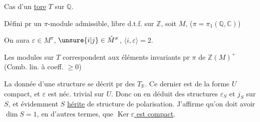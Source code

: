 
Cas d'un \uline{tore} $T$ sur $\mathbb Q$.

Défini pr un $\pi$-module admissible, libre d.t.f. sur $\mathbb Z$, soit $M$, ($\pi=\pi_1(\mathbb Q,\mathbb C)$)

On aura $\varepsilon\in M^\pi$, $\unsure{i|j}\in\check M^\pi$, $\langle i,\varepsilon\rangle=2$.

Les modules sur $T$ correspondent aux éléments invariants pr $\pi$ de $\mathbb Z(M)^+$ (Comb. lin. à coeff. $\geq0$)


La donnée d'une structure   se décrit pr des  $T_{\mathbb R}$. Ce dernier est de la forme   $U$ compact,   et $\varepsilon$ est néc. trivial sur $U$. Donc on en déduit des structures $\varepsilon_S$ et $j_S$ sur $S$, et évidemment $S$ \uline{hérite} de structure de polarisation. J'affirme qu'on doit avoir $\dim S=1$, en d'autres termes, que \uline{$\operatorname{Ker}\varepsilon$ est compact}.


